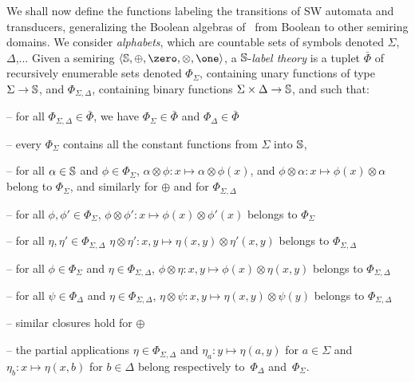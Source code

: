 %
%
We shall now define the functions labeling the transitions of SW automata and transducers,
generalizing the Boolean algebras of~\cite{dAntoniVeanes17CAV} 
from Boolean to other semiring domains.
%
We consider \emph{alphabets}, which are countable sets of symbols 
denoted $\Sigma$, $\Delta$,...
%
\noindent 
Given a semiring $\< \Semiring, \oplus, \zero, \otimes, \one>$, 
a $\mathbb{S}$-\emph{label theory}
is a tuplet $\bar\Phi$ of recursively enumerable sets denoted
$\Phi_\Sigma$, %
containing unary functions of type $\Sigma \to \mathbb{S}$, %
and $\Phi_{\Sigma, \Delta}$, containing binary functions $\Sigma \times \Delta \to \mathbb{S}$, 
and such that:

\noindent -- 
for all $\Phi_{\Sigma, \Delta} \in \bar\Phi$, we have
$\Phi_{\Sigma} \in \bar\Phi$ and $\Phi_{\Delta} \in \bar\Phi$

\noindent -- 
every $\Phi_{\Sigma}$ contains all the constant functions from $\Sigma$ into $\mathbb{S}$, 
 
\noindent -- 
for all $\alpha \in \mathbb{S}$ and $\phi \in \Phi_\Sigma$,
      $\alpha \otimes \phi : x \mapsto \alpha \otimes \phi(x)$, 
      and $\phi \otimes \alpha : x \mapsto \phi(x) \otimes \alpha$\\
\phantom{--} belong to $\Phi_\Sigma$, and similarly for $\oplus$ 
      and for $\Phi_{\Sigma, \Delta}$

\noindent -- 
for all $\phi, \phi' \in \Phi_\Sigma$,
$\phi \otimes \phi': x \mapsto \phi(x) \otimes \phi'(x)$ belongs to $\Phi_\Sigma$

\noindent -- 
for all $\eta, \eta' \in \Phi_{\Sigma, \Delta}$
$\eta \otimes \eta': x, y \mapsto \eta(x, y) \otimes \eta'(x, y)$ belongs to $\Phi_{\Sigma, \Delta}$

\noindent -- 
for all $\phi \in \Phi_\Sigma$ and $\eta \in \Phi_{\Sigma, \Delta}$,
$\phi \otimes \eta: x, y \mapsto \phi(x) \otimes \eta(x, y)$ belongs to $\Phi_{\Sigma, \Delta}$

\noindent -- 
for all $\psi \in \Phi_\Delta$ and $\eta \in \Phi_{\Sigma, \Delta}$,
$\eta \otimes \psi: x, y \mapsto \eta(x, y) \otimes \psi(y)$ belongs to $\Phi_{\Sigma, \Delta}$

\noindent -- 
similar closures hold for $\oplus$

\noindent -- 
the partial applications $\eta \in \Phi_{\Sigma, \Delta}$
and $\eta_a: y \mapsto \eta(a, y)$ for $a \in \Sigma$ %
and\\ 
\phantom{--} $\eta_b: x \mapsto \eta(x, b)$ for $b \in \Delta$ %
belong respectively to~$\Phi_\Delta$ and~$\Phi_\Sigma$.



